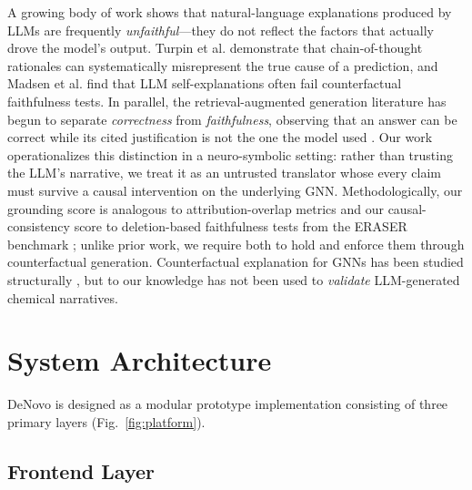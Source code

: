 \documentclass[conference]{IEEEtran}
\begin{document}
A growing body of work shows that natural-language explanations produced by LLMs are frequently \emph{unfaithful}---they do not reflect the factors that actually drove the model's output. Turpin et al. \cite{turpin2023language} demonstrate that chain-of-thought rationales can systematically misrepresent the true cause of a prediction, and Madsen et al. \cite{madsen2024selfexplanations} find that LLM self-explanations often fail counterfactual faithfulness tests. In parallel, the retrieval-augmented generation literature has begun to separate \emph{correctness} from \emph{faithfulness}, observing that an answer can be correct while its cited justification is not the one the model used \cite{correctness2024faithfulness}. Our work operationalizes this distinction in a neuro-symbolic setting: rather than trusting the LLM's narrative, we treat it as an untrusted translator whose every claim must survive a causal intervention on the underlying GNN. Methodologically, our grounding score is analogous to attribution-overlap metrics and our causal-consistency score to deletion-based faithfulness tests from the ERASER benchmark \cite{deyoung2020eraser}; unlike prior work, we require both to hold and enforce them through counterfactual generation. Counterfactual explanation for GNNs has been studied structurally \cite{lucic2022cfgnnexplainer}, but to our knowledge has not been used to \emph{validate} LLM-generated chemical narratives.

\section{System Architecture}

DeNovo is designed as a modular prototype implementation consisting of three primary layers (Fig.~\ref{fig:platform}).

\subsection{Frontend Layer}
\end{document}
